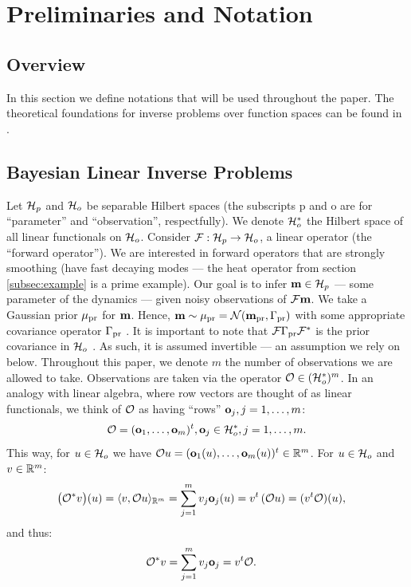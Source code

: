 \documentclass{amsart}
\numberwithin{equation}{section}
\begin{document}
\section{Preliminaries and Notation}\label{section:prelim}

\subsection{Overview}
In this section we define notations that will be used throughout the
paper. The theoretical foundations for inverse problems over function spaces
can be found in \cite{Stuart10}.


\subsection{Bayesian Linear Inverse Problems}\label{subsec:abstract OED}
Let $\mathcal{H}_p$ and $\mathcal{H}_o$ be separable Hilbert spaces (the subscripts p
and o are for ``parameter'' and ``observation'', respectfully). We
denote $\mathcal{H}_o^*$ the Hilbert space of all linear functionals on
$\mathcal{H}_o$. Consider $\mathcal{F}: \mathcal{H}_p \to \mathcal{H}_o$, a linear operator (the
``forward operator''). We are interested in forward operators that are
strongly smoothing (have fast decaying modes --- the heat operator
from section \ref{subsec:example} is a prime example). Our goal is to
infer $\mathbf{m} \in \mathcal{H}_p$ --- some parameter of the dynamics --- given
noisy observations of $\mathcal{F} \mathbf{m}$. We take a Gaussian prior $\mu_{\textup{pr}}$
for $\mathbf{m}$. Hence, $\mathbf{m} \sim \mu_{\textup{pr}} = \mathcal{N}(\mathbf{m}_{\textup{pr}} ,\Gamma_{\textup{pr}})$ with
some appropriate covariance operator $\Gamma_{\textup{pr}}$ \cite{Stuart10}. It is
important to note that $\mathcal{F} \Gamma_{\textup{pr}} \mathcal{F}^*$ is the prior covariance in
$\mathcal{H}_o$ \cite{Stuart10}. As such, it is assumed invertible --- an
assumption we rely on below. Throughout this paper, we denote $m$ the
number of observations we are allowed to take. Observations are taken
via the operator $\mathcal{O} \in ( \mathcal{H}_o^* )^m$. In an analogy with linear
algebra, where row vectors are thought of as linear functionals, we
think of $\mathcal{O}$ as having ``rows'' $\mathbf{o}_j, j=1,\dots,m$:
\begin{equation}\label{eq:O}
  \mathcal{O} = (\mathbf{o}_1,\dots, \mathbf{o}_m)^t, \mathbf{o}_j \in \mathcal{H}_o^*, j = 1,\dots,m.
\end{equation}
This way, for $u \in \mathcal{H}_o$ we have $\mathcal{O} u = (\mathbf{o}_1(u), \dots,
\mathbf{o}_m(u) )^t \in \mathbb{R}^m$.
For $u \in \mathcal{H}_o$ and $v\in \mathbb{R}^m$:
\begin{align*}
  \big (\mathcal{O}^*v \big ) (u) &= \langle v, \mathcal{O} u \rangle_{\mathbb{R}^m} = \sum_{j=1}^m  v_j \mathbf{o}_j(u)
  = v^t \left ( \mathcal{O} u \right ) = (v^t \mathcal{O}) (u),
\end{align*}
and thus:
\begin{align}\label{eq:obs*}
  \mathcal{O}^*v &= \sum_{j=1}^m v_j \mathbf{o}_j = v^t \mathcal{O}.
\end{align}
\end{document}

